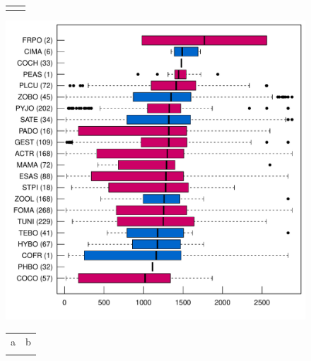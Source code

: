 \documentclass{article}\usepackage[]{graphicx}\usepackage[]{color}
\makeatletter
\def\maxwidth{ %
  \ifdim\Gin@nat@width>\linewidth
    \linewidth
  \else
    \Gin@nat@width
  \fi
}
\newenvironment{kframe}{%
 \def\at@end@of@kframe{}%
 \ifinner\ifhmode%
  \def\at@end@of@kframe{\end{minipage}}%
  \begin{minipage}{\columnwidth}%
 \fi\fi%
 \def\FrameCommand##1{\hskip\@totalleftmargin \hskip-\fboxsep
 \colorbox{shadecolor}{##1}\hskip-\fboxsep
     \hskip-\linewidth \hskip-\@totalleftmargin \hskip\columnwidth}%
 \MakeFramed {\advance\hsize-\width
   \@totalleftmargin\z@ \linewidth\hsize
   \@setminipage}}%
 {\par\unskip\endMakeFramed%
 \at@end@of@kframe}
\newenvironment{knitrout}{}{} %
\makeatother
\begin{document}
{\begin{figure}
\begin{tabular}{cc}
\begin{knitrout}
{}



\end{knitrout}
\end{tabular}
\caption{\label{boxrange}}
\end{figure}


\begin{figure}
\begin{knitrout}
\color{fgcolor}

{\centering \includegraphics[width=\maxwidth]{figures/zoizos-boxalti-1} 

}



\end{knitrout}
\caption{\label{boxalti}}
\end{figure}



\clearpage

\begin{figure}
\hspace{-2cm}
\begin{tabular}{cc}
a& b\\
\begin{knitrout}
\definecolor{shadecolor}{rgb}{0.878, 0.878, 0.878}\color{fgcolor}\begin{kframe}



\end{kframe}
\end{knitrout}
\end{tabular}
\end{figure}}
\end{document}
